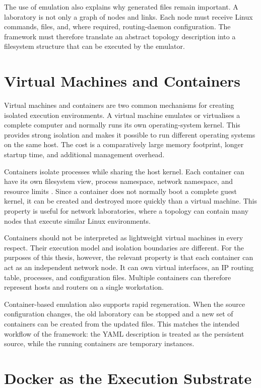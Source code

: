 The use of emulation also explains why generated files remain important. A
laboratory is not only a graph of nodes and links. Each node must receive Linux
commands, files, and, where required, routing-daemon configuration. The
framework must therefore translate an abstract topology description into a
filesystem structure that can be executed by the emulator.

\section{Virtual Machines and Containers}
\label{sec:virtual-machines-containers}

Virtual machines and containers are two common mechanisms for creating
isolated execution environments. A virtual machine emulates or virtualises a
complete computer and normally runs its own operating-system kernel. This
provides strong isolation and makes it possible to run different operating
systems on the same host. The cost is a comparatively large memory footprint,
longer startup time, and additional management overhead.

Containers isolate processes while sharing the host kernel. Each container
can have its own filesystem view, process namespace, network namespace, and
resource limits \cite{docker_container,docker_overview}. Since a container does not normally boot a complete guest
kernel, it can be created and destroyed more quickly than a virtual machine.
This property is useful for network laboratories, where a topology can contain
many nodes that execute similar Linux environments.

Containers should not be interpreted as lightweight virtual machines in every
respect. Their execution model and isolation boundaries are different. For the
purposes of this thesis, however, the relevant property is that each container
can act as an independent network node. It can own virtual interfaces, an IP
routing table, processes, and configuration files. Multiple containers can
therefore represent hosts and routers on a single workstation.

Container-based emulation also supports rapid regeneration. When the source
configuration changes, the old laboratory can be stopped and a new set of
containers can be created from the updated files. This matches the intended
workflow of the framework: the YAML description is treated as the persistent
source, while the running containers are temporary instances.

\section{Docker as the Execution Substrate}
\label{sec:docker}

